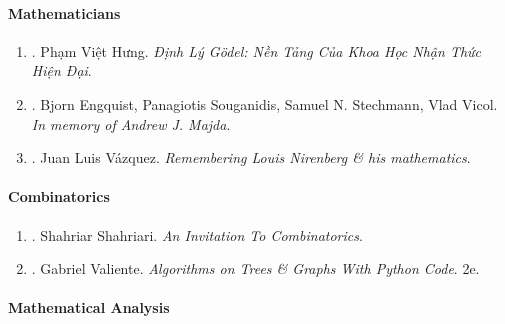 \documentclass{article}
\begin{document}
\paragraph{Mathematicians}

\begin{enumerate}
	\item \cite{Hung_Godel_thm}. {\sc Phạm Việt Hưng}. {\it Định Lý G\"odel: Nền Tảng Của Khoa Học Nhận Thức Hiện Đại}.\hfill{\sf[done]}

	\item \cite{memory_Andrew_Joseph_Majda}. {\sc Bjorn Engquist, Panagiotis Souganidis, Samuel N. Stechmann, Vlad Vicol}. {\it In memory of {\sc Andrew J. Majda}}.\hfill{\sf[reading]}

	\item \cite{Vazquez_remember_Nirenberg}. {\sc Juan Luis V\'{a}zquez}. {\it Remembering {\sc Louis Nirenberg} \& his mathematics}.\hfill{\sf[reading]}
\end{enumerate}

\paragraph{Combinatorics}

\begin{enumerate}
    \item \cite{Shahriari2022}. {\sc Shahriar Shahriari}. {\it An Invitation To Combinatorics}.

    \item \cite{Valiente2002, Valiente2021}. {\sc Gabriel Valiente}. {\it Algorithms on Trees \& Graphs With Python Code}. 2e.
\end{enumerate}

\paragraph{Mathematical Analysis}
\end{document}
